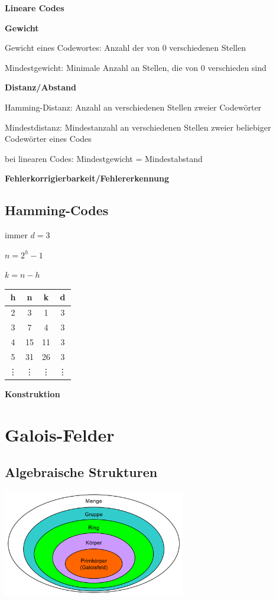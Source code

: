\textbf{Lineare Codes}


\textbf{Gewicht}

Gewicht eines Codewortes: Anzahl der von 0 verschiedenen Stellen

Mindestgewicht: Minimale Anzahl an Stellen, die von 0 verschieden sind

\textbf{Distanz/Abstand}

Hamming-Distanz: Anzahl an verschiedenen Stellen zweier Codewörter

Mindestdistanz: Mindestanzahl an verschiedenen Stellen zweier beliebiger Codewörter eines Codes

bei linearen Codes: Mindestgewicht = Mindestabstand

\textbf{Fehlerkorrigierbarkeit/Fehlererkennung}


\subsection{Hamming-Codes}

immer $d=3$

$\displaystyle{
    n = 2^h - 1
}$

$\displaystyle{
    k = n - h
}$

\begin{tabular}{c|c c c}
    h & n & k & d\\
    \hline
    2 & 3 & 1 & 3\\
    3 & 7 & 4 & 3\\
    4 & 15 & 11 & 3\\
    5 & 31 & 26 & 3\\
    \vdots & \vdots & \vdots & \vdots
\end{tabular}

\textbf{Konstruktion}

\section{Galois-Felder}
\label{sec:galois}

\subsection{Algebraische Strukturen}

\includegraphics[width=8cm]{img/algebraische_strukturen.PNG}

